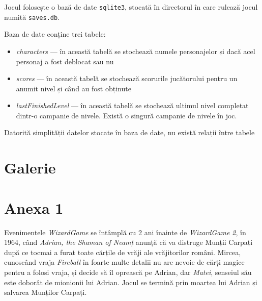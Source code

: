\documentclass{article}
\begin{document}
    Jocul folosește o bază de date \texttt{sqlite3}, stocată în directorul în care rulează jocul
    numită \texttt{saves.db}.

    Baza de date conține trei tabele:
    \begin{itemize}
        \item \emph{characters} --- în această tabelă se stochează numele personajelor și dacă acel
        personaj a fost deblocat sau nu
        \item \emph{scores} --- în această tabelă se stochează scorurile jucătorului pentru un anumit
        nivel și când au fost obținute
        \item \emph{lastFinishedLevel} --- în această tabelă se stochează ultimul nivel completat
        dintr-o campanie de nivele. Există o singură campanie de nivele în joc.
    \end{itemize}

    Datorită simplității datelor stocate în baza de date, nu există relații între tabele

    \section{Galerie}

    \section*{Anexa 1}
    \label{sec:anexa1}
    Evenimentele \emph{WizardGame} se întâmplă cu 2 ani înainte de \emph{WizardGame 2}, în 1964,
    când \emph{Adrian, the Shaman of Neamț} anunță că va distruge Munții Carpați după ce tocmai
    a furat toate cărțile de vrăji ale vrăjitorilor români. Mircea, cunoscând vraja \emph{Fireball}
    în foarte multe detalii nu are nevoie de cărți magice pentru a folosi vraja, și decide să îl
    oprească pe Adrian, dar \emph{Matei}, senseiul său este doborât de mionionii lui Adrian.
    Jocul se termină prin moartea lui Adrian și salvarea Munților Carpați.

\end{document}
